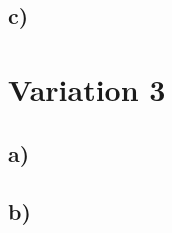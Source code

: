 \documentclass[a4paper, 11pt]{article}
\begin{document}
\subsection{c)} %



\section{Variation 3} %
\label{sec:variation_3}

\subsection{a)} %


\subsection{b)} %
\end{document}
